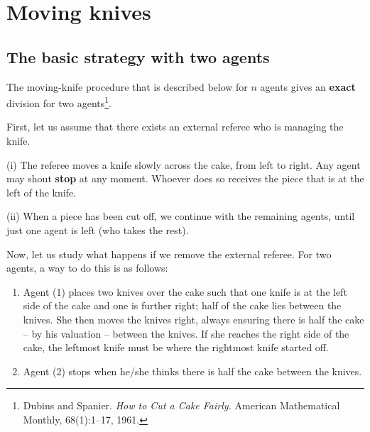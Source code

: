 \section{Moving knives}
\label{sec:movingknives}

\subsection{The basic strategy with two agents}

The moving-knife procedure that is described below for $n$ agents gives an \textbf{exact} division for two agents\footnote{Dubins and Spanier. 
\textit{How to Cut a Cake Fairly.}  American Mathematical Monthly, 68(1):1–17, 1961.}. 

First, let us assume that there exists an external referee who is managing the knife. 


(i) The referee moves a knife slowly across the cake, from left to right. 
Any agent may shout \textbf{stop} at any moment. Whoever does so receives the piece that is at the left of the knife.

(ii) When a piece has been cut off, we continue with the remaining agents, until just one agent is left (who takes the rest).
\bigskip 

Now, let us study what happens if we remove the external referee. 
For two agents, a way to do this is as follows:

\begin{enumerate}
\item 
Agent (1) places two knives over the cake such that one knife is at the left side of the cake and one is further right; 
half of the cake lies between the knives. 
She then moves the knives right, always ensuring there is half the cake – by his valuation – between the knives. 
If she reaches the right side of the cake, the leftmost knife must be where the rightmost knife started off. 
\item Agent (2) stops when he/she thinks there is half the cake between the knives. 
\end{enumerate}
\bigskip


